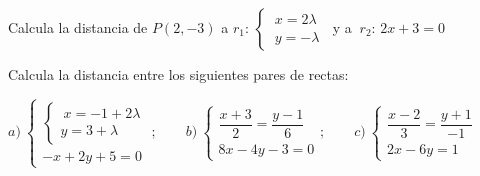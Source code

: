 \vspace{-8mm}
\begin{flushright}
\begin{footnotesize} \textcolor{gris}{}	\end{footnotesize}
\end{flushright}


\begin{mipropuesto}

Calcula la distancia de $P(2,-3)$ a $r_1:\, \begin{cases}\ x=2\lambda \\ \ y=-\lambda \end{cases} \ $ y a $\ r_2:\, 2x+3=0$

\end{mipropuesto}

\vspace{-8mm}
\begin{flushright}
\begin{footnotesize} \textcolor{gris}{}	\end{footnotesize}
\end{flushright}


\begin{mipropuesto}

Calcula la distancia entre los siguientes pares de rectas:

\vspace{2mm} $a)\ \begin{cases} \begin{cases} \ x=-1+2\lambda \\ y=3+\lambda \end{cases} \\ -x+2y+5=0 \end{cases};\qquad 
b)\ \begin{cases} \dfrac{x+3}{2}=\dfrac{y-1}{6} \\ 8x-4y-3=0 \end{cases};\qquad 
c)\ \begin{cases} \dfrac{x-2}{3}=\dfrac{y+1}{-1} \\ 2x-6y=1 \end{cases}$

\end{mipropuesto}

\vspace{-8mm}
\begin{flushright}
\begin{footnotesize} \textcolor{gris}{}	\end{footnotesize}
\end{flushright}


